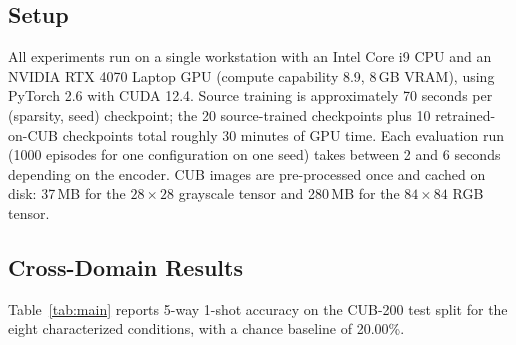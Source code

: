 \documentclass[11pt]{article}
\begin{document}
\subsection{Setup}
\label{subsec:setup}

All experiments run on a single workstation with an Intel Core i9 CPU and an NVIDIA RTX 4070 Laptop GPU (compute capability 8.9, 8\,GB VRAM), using PyTorch 2.6 with CUDA 12.4. Source training is approximately 70 seconds per (sparsity, seed) checkpoint; the 20 source-trained checkpoints plus 10 retrained-on-CUB checkpoints total roughly 30 minutes of GPU time. Each evaluation run (1000 episodes for one configuration on one seed) takes between 2 and 6 seconds depending on the encoder. CUB images are pre-processed once and cached on disk: 37\,MB for the $28 \times 28$ grayscale tensor and 280\,MB for the $84 \times 84$ RGB tensor.

\subsection{Cross-Domain Results}
\label{subsec:xdomain-results}

Table~\ref{tab:main} reports 5-way 1-shot accuracy on the CUB-200 test split for the eight characterized conditions, with a chance baseline of 20.00\%.
\end{document}

